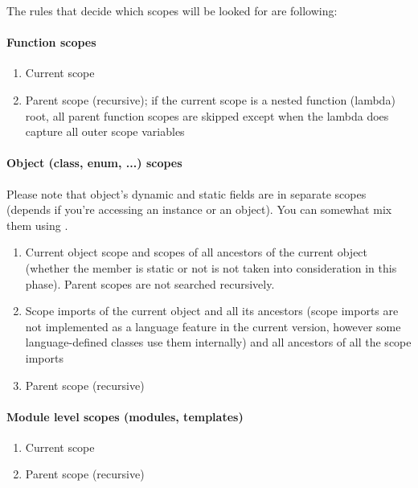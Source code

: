 The rules that decide which scopes will be looked for are following:

\paragraph{Function scopes}
\begin{enumerate}
	\item Current scope
	\item Parent scope (recursive); if the current scope is a nested function (lambda) root, all parent function scopes are skipped except when the lambda does capture all outer scope variables
\end{enumerate}

\paragraph{Object (class, enum, ...) scopes}
Please note that object's dynamic and static fields are in separate scopes (depends if you're accessing an instance or an object). You can somewhat mix them using .

\begin{enumerate}
	\item Current object scope and scopes of all ancestors of the current object (whether the member is static or not is not taken into consideration in this phase). Parent scopes are not searched recursively.
	\item Scope imports of the current object and all its ancestors (scope imports are not implemented as a language feature in the current version, however some language-defined classes use them internally) and all ancestors of all the scope imports
	\item Parent scope (recursive)
\end{enumerate}

\paragraph{Module level scopes (modules, templates)}
\begin{enumerate}
	\item Current scope
	\item Parent scope (recursive)
\end{enumerate}

\begin{comment}
\textbf{Namespace scopes}
\begin{compactenum}
\item Current scope and scopes of all namespaces with the same (full) identifier in any of the modules that have been imported in the identifier resolution scope (that means also all imports derived from parent scopes).
\item Parent scope (recursive)
\end{compactenum}
\end{comment}

